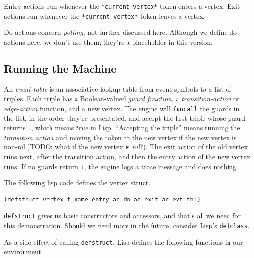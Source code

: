 \documentclass[10pt,oneside,x11names]{article}
\begin{document}
Entry actions run whenever the \texttt{*current-vertex*} token enters a vertex.
Exit actions run whenever the \texttt{*current-vertex*} token leaves a vertex.

Do-actions concern \emph{polling}, not further discussed here. Although we define
do-actions here, we don't use them; they're a placeholder in this version.

\subsection{Running the Machine}
\label{sec:orgb58d838}
\label{section:running}

An \emph{event table} is an associative lookup table from event symbols to a list
of triples. Each triple has a Boolean-valued \emph{guard function}, a
\emph{transition-action} or \emph{edge-action} function, and a new vertex. The engine
will \texttt{funcall} the guards in the list, in the order they're presentated, and
accept the first triple whose guard returns \texttt{t}, which means \emph{true} in Lisp.
``Accepting the triple'' means running the \emph{transition action} and moving the
token to the new vertex if the new vertex is non-nil (TODO: what if the new
vertex is \emph{nil}?). The exit action of the old vertex runs next, after the
transition action, and then the entry action of the new vertex runs. If no
guards return \texttt{t}, the engine logs a trace message and does nothing.

The following lisp code defines the vertex struct.

\begin{verbatim}
(defstruct vertex-t name entry-ac do-ac exit-ac evt-tbl)
\end{verbatim}

\texttt{defstruct} gives us basic constructors and accessors, and that's all we need
for this demonstration. Should we need more in the future, consider
Lisp's \texttt{defclass}.

As a side-effect of calling \texttt{defstruct}, Lisp defines the following functions
in our environment
\end{document}
